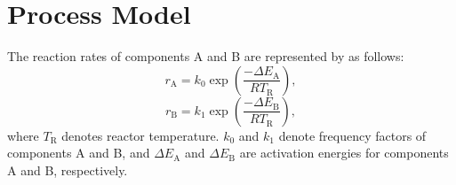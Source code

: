 \documentclass[a4paper,10pt]{article}
\begin{document}
\section{Process Model}

The reaction rates of components A and B are represented by as follows:
\begin{equation}
  r_{\mathrm{A}} = k_{0} \exp\left(\frac{-\Delta E_{\mathrm{A}}}{RT_{\mathrm{R}}}\right),
\end{equation}
\begin{equation}
  r_{\mathrm{B}} = k_{1} \exp\left(\frac{-\Delta E_{\mathrm{B}}}{RT_{\mathrm{R}}}\right),
\end{equation}
where $T_{\mathrm{R}}$ denotes reactor temperature.
$k_{0}$ and $k_{1}$ denote frequency factors of components A and B, and $\Delta E_{\mathrm{A}}$ and $\Delta E_{\mathrm{B}}$ are activation energies for components A and B, respectively.
\end{document}
